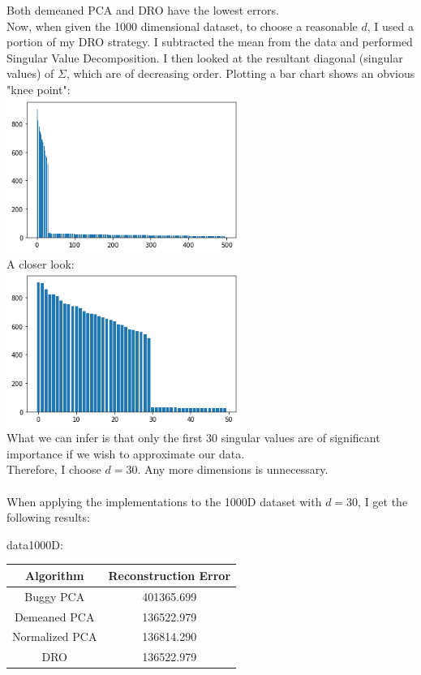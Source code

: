 \documentclass[a4paper]{article}
\newcounter{thm}
\theoremstyle{definition}
\newenvironment{soln}{
	\leavevmode\color{blue}\ignorespaces
}{}
\begin{document}
\begin{itemize}
\begin{soln}
	Both demeaned PCA and DRO have the lowest errors. \\
	Now, when given the 1000 dimensional dataset, to choose a reasonable $d$, I used a portion of my DRO strategy. I subtracted the mean from the data and performed Singular Value Decomposition. I then looked at the resultant diagonal (singular values) of $\Sigma$, which are of decreasing order. Plotting a bar chart shows an obvious "knee point": \\
	\includegraphics[width=3in]{sigma_500} \\
	A closer look: \\
	\includegraphics[width=3in]{sigma_50} \\
	What we can infer is that only the first $30$ singular values are of significant importance if we wish to approximate our data. \\
	Therefore, I choose $d = 30$. Any more dimensions is unnecessary. \\ \\
	When applying the implementations to the 1000D dataset with $d = 30$, I get the following results: \\
	\begin{center}
		data1000D: 
		\begin{tabular}{ c  c }
			Algorithm & Reconstruction Error \\
			\hline
			Buggy PCA & 401365.699 \\
			Demeaned PCA & 136522.979 \\
			Normalized PCA & 136814.290 \\
			DRO & 136522.979 \\
		\end{tabular}
	\end{center}
\end{soln}


\end{itemize}
\end{document}
